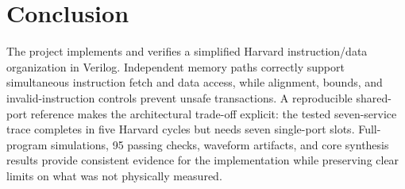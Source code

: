 \documentclass[conference]{IEEEtran}
\begin{document}
\section{Conclusion}
The project implements and verifies a simplified Harvard instruction/data organization in Verilog. Independent memory paths correctly support simultaneous instruction fetch and data access, while alignment, bounds, and invalid-instruction controls prevent unsafe transactions. A reproducible shared-port reference makes the architectural trade-off explicit: the tested seven-service trace completes in five Harvard cycles but needs seven single-port slots. Full-program simulations, 95 passing checks, waveform artifacts, and core synthesis results provide consistent evidence for the implementation while preserving clear limits on what was not physically measured.



\end{document}
